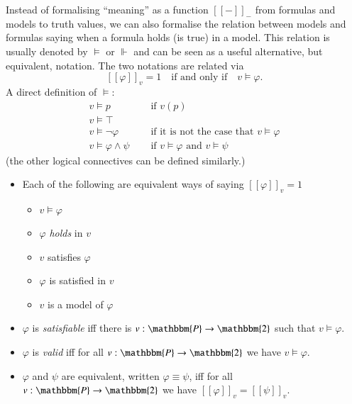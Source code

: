 \documentclass[11pt]{article}
\renewcommand{\phi}{\varphi}
\newcommand{\et}{\ensuremath{\wedge}} %
\newcommand{\sem}[1]{[\![#1]\!]}
\newcommand{\bbtwo}{\mathbbm{2}}
\newcommand{\bbP}{\mathbbm{P}}
\begin{document}
\medskip\noindent Instead of formalising ``meaning'' as a function $\sem{-}_-$
from formulas and models to truth values, we can also formalise the
relation between models and formulas saying when a formula holds (is
true) in a model. This relation is usually denoted by $\models$ or
$\Vdash$ and can be seen as a useful alternative, but equivalent,
notation. The two notations are related via  \[\sem{\phi}_v=1 \quad \textrm{if and only if} \quad
v\models\phi.\] A direct definition of $\models$:
\begin{align*}
  v\models p & \quad\textrm{ if }  v(p)\\
  v\models\top \\
  v\models{\neg\phi} & \quad\textrm{ if it is not the case that } v\models\phi \\
  v\models{\phi\et\psi} & \quad\textrm{ if } v\models\phi \textrm{ and } v\models\psi
\end{align*}
(the other logical connectives can be defined similarly.)

\begin{definition}
\begin{itemize}
\item Each of the following are equivalent ways of saying $\sem{\phi}_v=1$
\begin{itemize}
\item $v\models\phi$
\item $\phi$ \emph{holds} in $v$
\item $v$ satisfies $\phi$
\item $\phi$ is satisfied in $v$
\item $v$ is a model of $\phi$
\end{itemize}

\item $\phi$ is \emph{satisfiable} iff there is $v:\bbP\to \bbtwo$ such that
  $v\models\phi$.
\item $\phi$ is \emph{valid} iff for all $v:\bbP\to \bbtwo$ we have
  $v\models\phi$.
\item $\phi$ and $\psi$ are equivalent, written $\phi\equiv\psi$, iff
  for all $v:\bbP\to \bbtwo$ we have $\sem{\phi}_v=\sem{\psi}_v$.
\end{itemize}
\end{definition}
\end{document}
